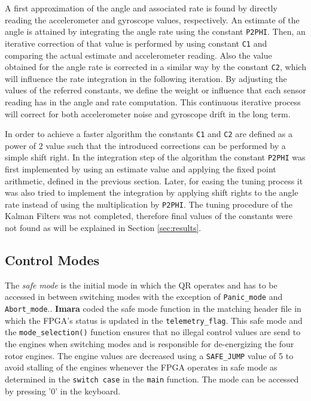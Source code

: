 \documentclass{article}
\begin{document}
A first approximation of the angle and associated rate is found by directly reading the accelerometer and gyroscope values, respectively. An estimate of the angle is attained by integrating the angle rate using the constant \texttt{P2PHI}. Then, an iterative correction of that value is performed by using constant \texttt{C1} and comparing the actual estimate and accelerometer reading. Also the value obtained for the angle rate is corrected in a similar way by the constant \texttt{C2}, which will influence the rate integration in the following iteration. By adjusting the values of the referred constants, we define the weight or influence that each sensor reading has in the angle and rate computation. This continuous iterative process will correct for both accelerometer noise and gyroscope drift in the long term.

In order to achieve a faster algorithm the constants \texttt{C1} and \texttt{C2} are defined as a power of $2$ value such that the introduced corrections can be performed by a simple shift right. In the integration step of the algorithm the constant \texttt{P2PHI} was first implemented by using an estimate value and applying the fixed point arithmetic, defined in the previous section. Later, for easing the tuning process it was also tried to implement the integration by applying shift rights to the angle rate instead of using the multiplication by \texttt{P2PHI}. The tuning procedure of the Kalman Filters was not completed, therefore final values of the constants were not found as will be explained in Section \ref{sec:results}.


\subsection{Control Modes}

\label{sec:safemode}
The \emph{safe mode} is the initial mode in which the QR operates and has to be accessed in between switching modes with the exception of \texttt{Panic\_mode} and \texttt{Abort\_mode}.. \textbf{Imara} coded the safe mode function in the matching header file in which the FPGA's status is updated in the \texttt{telemetry\_flag}. This safe mode and the \texttt{mode\_selection()} function ensures that no illegal control values are send to the engines when switching modes and is responsible for de-energizing the four rotor engines. The engine values are decreased using a \texttt{SAFE\_JUMP} value of 5 to avoid stalling of the engines whenever the FPGA operates in safe mode as determined in the \texttt{switch case} in the \texttt{main} function. The mode can be accessed by pressing '$0$' in the keyboard.\\
\end{document}
